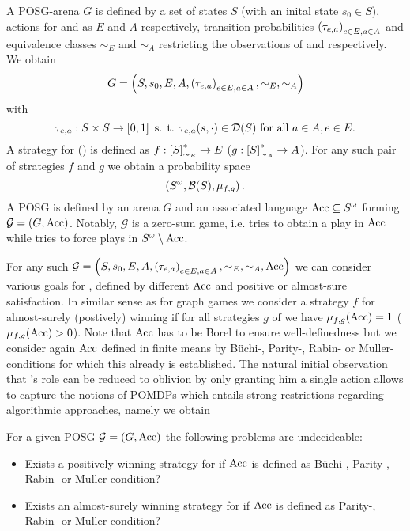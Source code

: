 \begin{definition}
  A \ac{POSG}-arena $G$ is defined by a set of states $S$ (with an 
  inital state $s_{0}\in S$), actions for \eve{} and \adam{} as $E$ and $A$ 
  respectively, transition probabilities $\left(\tau_{e,a}\right)_{e\in E, a\in A}$ 
  and equivalence classes $\sim_{E}$ and $\sim_{A}$ restricting the 
  observations of \eve{} and \adam{} respectively. We obtain
  \begin{equation*}
    G = \left(S, s_{0}, E, A, \left(\tau_{e,a}\right)_{e\in E, a\in A}, 
    \sim_{E}, \sim_{A}\right)
  \end{equation*}
  with
  \begin{equation*}
    \tau_{e,a}:S\times S\rightarrow\left[0,1\right] \text{ s. t. }
    \tau_{e,a}(s, \cdot)\in\mathcal{D}(S)\text{ for all }a\in A, e\in E.
  \end{equation*}
  A strategy for \eve{} (\adam{}) is defined as 
  $f:\left[S\right]_{\sim_{E}}^{*}\rightarrow E$ 
  ($g:\left[S\right]_{\sim_{A}}^{*}\rightarrow A$). For any such pair of 
  strategies $f$ and $g$ we obtain a probability space
  \begin{equation*}
    \left(S^{\omega}, \mathcal{B}(S), \mu_{f, g}\right).
  \end{equation*}
  A \ac{POSG} is defined by an arena $G$ and an associated language
  $\operatorname{Acc}\subseteq S^{\omega}$ forming $\mathcal{G} = \left(G, \operatorname{Acc}\right)$. Notably,
  $\mathcal{G}$ is a zero-sum game, i.e. \eve{} tries to obtain a play in 
  $\operatorname{Acc}$ while \adam{} tries to force plays in $S^{\omega}\setminus\operatorname{Acc}$.
\end{definition}
For any such $\mathcal{G} = \left(
S, s_{0}, E, A, \left(\tau_{e,a}\right)_{e\in E, a\in A}, \sim_{E}, \sim_{A}, \operatorname{Acc}\right)$ 
we can consider various goals for \eve{}, defined by different $\operatorname{Acc}$ and
positive or almost-sure satisfaction. In similar sense as for graph games we
consider a strategy $f$ for \eve{} almost-surely (postively) winning if for all
strategies $g$ of \adam{} we have $\mu_{f,g}(\operatorname{Acc}) = 1$ 
($\mu_{f,g}(\operatorname{Acc}) > 0$). Note that $\operatorname{Acc}$ has to be Borel to ensure 
well-definedness but we consider again $\operatorname{Acc}$ defined in finite means by 
Büchi-, Parity-, Rabin- or Muller-conditions for which this already is 
established. The natural initial observation that \adam{}'s role can be reduced 
to oblivion by only granting him a single action allows to capture the notions
of \acp{POMDP} which entails strong restrictions regarding algorithmic 
approaches, namely we obtain
\begin{corollary}
  \cite{PureStratPOSG, POSG}
  For a given \ac{POSG} $\mathcal{G} = \left(G, \operatorname{Acc}\right)$ the following problems
  are undecideable:
  \begin{itemize}
    \item Exists a positively winning strategy for \eve{} if $\operatorname{Acc}$ is defined 
      as Büchi-, Parity-, Rabin- or Muller-condition?
    \item Exists an almost-surely winning strategy for \eve{} if $\operatorname{Acc}$ is
      defined as Parity-, Rabin- or Muller-condition?
  \end{itemize}
\end{corollary}
